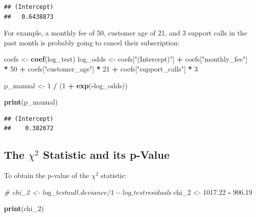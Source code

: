 \documentclass[
]{article}
\newenvironment{Shaded}{\begin{snugshade}}{\end{snugshade}}
\newcommand{\CommentTok}[1]{\textcolor[rgb]{0.56,0.35,0.01}{\textit{#1}}}
\newcommand{\DecValTok}[1]{\textcolor[rgb]{0.00,0.00,0.81}{#1}}
\newcommand{\FloatTok}[1]{\textcolor[rgb]{0.00,0.00,0.81}{#1}}
\newcommand{\FunctionTok}[1]{\textcolor[rgb]{0.13,0.29,0.53}{\textbf{#1}}}
\newcommand{\NormalTok}[1]{#1}
\newcommand{\OtherTok}[1]{\textcolor[rgb]{0.56,0.35,0.01}{#1}}
\newcommand{\SpecialCharTok}[1]{\textcolor[rgb]{0.81,0.36,0.00}{\textbf{#1}}}
\newcommand{\StringTok}[1]{\textcolor[rgb]{0.31,0.60,0.02}{#1}}
\begin{document}
\begin{verbatim}
## (Intercept) 
##   0.6438873
\end{verbatim}

For example, a monthly fee of 50, customer age of 21, and 3 support
calls in the past month is probably going to cancel their subscription:

\begin{Shaded}
\begin{Highlighting}[]
\NormalTok{coefs }\OtherTok{\textless{}{-}} \FunctionTok{coef}\NormalTok{(log\_test)}
\NormalTok{log\_odds   }\OtherTok{\textless{}{-}}\NormalTok{ coefs[}\StringTok{"(Intercept)"}\NormalTok{] }\SpecialCharTok{+} 
\NormalTok{  coefs[}\StringTok{"monthly\_fee"}\NormalTok{] }\SpecialCharTok{*} \DecValTok{50} \SpecialCharTok{+}
\NormalTok{  coefs[}\StringTok{"customer\_age"}\NormalTok{] }\SpecialCharTok{*} \DecValTok{21} \SpecialCharTok{+}
\NormalTok{  coefs[}\StringTok{"support\_calls"}\NormalTok{] }\SpecialCharTok{*} \DecValTok{3}

\NormalTok{p\_manual }\OtherTok{\textless{}{-}} \DecValTok{1} \SpecialCharTok{/}\NormalTok{ (}\DecValTok{1} \SpecialCharTok{+} \FunctionTok{exp}\NormalTok{(}\SpecialCharTok{{-}}\NormalTok{log\_odds))}

\FunctionTok{print}\NormalTok{(p\_manual)}
\end{Highlighting}
\end{Shaded}

\begin{verbatim}
## (Intercept) 
##    0.382672
\end{verbatim}

\subsection{\texorpdfstring{The \(\chi^2\) Statistic and its
p-Value}{The \textbackslash chi\^{}2 Statistic and its p-Value}}\label{the-chi2-statistic-and-its-p-value}

To obtain the p-value of the \(\chi^2\) statistic:

\begin{Shaded}
\begin{Highlighting}[]
\CommentTok{\# chi\_2 \textless{}{-} log\_test$null.deviance/1 {-} log\_test$residuals}
\NormalTok{chi\_2 }\OtherTok{\textless{}{-}} \FloatTok{1017.22} \SpecialCharTok{{-}} \FloatTok{906.19}

\FunctionTok{print}\NormalTok{(chi\_2)}
\end{Highlighting}
\end{Shaded}
\end{document}
